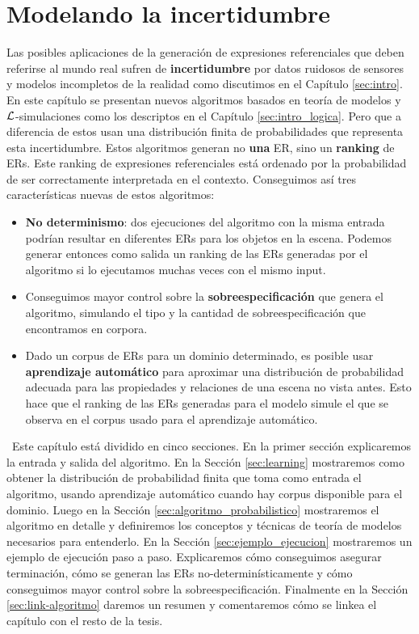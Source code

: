 \chapter{Modelando la incertidumbre}
\label{sec:algoritmo}
 Las posibles aplicaciones de la generaci\'on de expresiones referenciales que deben referirse al mundo real sufren de \textbf{incertidumbre} por datos ruidosos de sensores y modelos incompletos de la realidad como discutimos en el Cap\'itulo \ref{sec:intro}.
En este cap\'itulo se presentan nuevos algoritmos basados en teor\'ia de modelos y $\mathcal{L}$-simulaciones como los descriptos en el Cap\'itulo \ref{sec:intro_logica}. Pero que a diferencia de estos usan una distribuci\'on finita de probabilidades que representa esta incertidumbre. Estos algoritmos generan no \textbf{una} ER, sino un \textbf{ranking} de ERs. Este ranking de expresiones referenciales est\'a ordenado por la probabilidad de ser correctamente interpretada en el contexto. 
Conseguimos as\'i tres caracter\'isticas nuevas de estos algoritmos:
\begin{itemize}
 \item \textbf{No determinismo}: dos ejecuciones del algoritmo con la
misma entrada podr\'{i}an resultar en diferentes ERs para los objetos en la escena. Podemos generar entonces como salida un ranking de las ERs generadas por el algoritmo si lo ejecutamos muchas veces con
el mismo input. 
 \item Conseguimos mayor control sobre la \textbf{sobreespecificaci\'on} que genera el algoritmo, simulando el tipo y la cantidad de sobreespecificaci\'on que encontramos en  corpora.
 \item Dado un corpus de ERs para un dominio determinado,
es posible usar \textbf{aprendizaje autom\'atico} para aproximar una distribuci\'on de probabilidad adecuada para las propiedades y relaciones de una escena no vista antes. Esto hace que el ranking de las ERs generadas para el modelo simule el que se observa en el corpus usado para el aprendizaje autom\'atico.
\end{itemize}
\
Este cap\'itulo est\'a dividido en cinco secciones. En la primer secci\'on explicaremos la entrada y salida del algoritmo. En la Secci\'on \ref{sec:learning} mostraremos como obtener la distribuci\'on de probabilidad finita que toma como entrada el algoritmo, usando aprendizaje autom\'atico cuando hay corpus disponible para el dominio. Luego en la Secci\'on \ref{sec:algoritmo_probabilistico} mostraremos el algoritmo en detalle y definiremos los conceptos y t\'ecnicas de teor\'ia de modelos necesarios para entenderlo. En la Secci\'on \ref{sec:ejemplo_ejecucion} mostraremos un ejemplo de ejecuci\'on paso a paso. Explicaremos c\'omo conseguimos asegurar terminaci\'on, c\'omo se generan las ERs no-determin\'isticamente y c\'omo conseguimos mayor control sobre la sobreespecificaci\'on. Finalmente en la Secci\'on \ref{sec:link-algoritmo} daremos un resumen y comentaremos c\'omo se linkea el cap\'itulo con el resto de la tesis.

